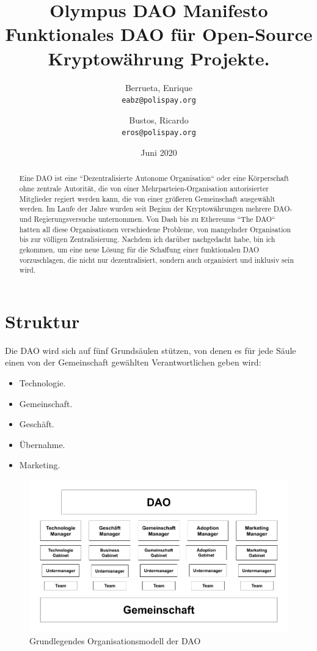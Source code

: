 \documentclass{article}
\title{%
  Olympus DAO Manifesto \\
  \large Funktionales DAO für Open-Source Kryptowährung Projekte.}
\author{
  Berrueta, Enrique\\
  \texttt{eabz@polispay.org}
  \and
  Bustos, Ricardo\\
  \texttt{eros@polispay.org}
}
\date{Juni 2020}
\begin{document}
\maketitle

	\begin{abstract}
    Eine DAO ist eine ``Dezentralisierte Autonome Organisation`` oder eine Körperschaft ohne zentrale Autorität, die von einer Mehrparteien-Organisation autorisierter Mitglieder regiert werden kann, die von einer größeren Gemeinschaft ausgewählt werden. Im Laufe der Jahre wurden seit Beginn der Kryptowährungen mehrere DAO- und Regierungsversuche unternommen. Von Dash bis zu Ethereums ``The DAO`` hatten all diese Organisationen verschiedene Probleme, von mangelnder Organisation bis zur völligen Zentralisierung. Nachdem ich darüber nachgedacht habe, bin ich gekommen, um eine neue Lösung für die Schaffung einer funktionalen DAO vorzuschlagen, die nicht nur dezentralisiert, sondern auch organisiert und inklusiv sein wird.
	\end{abstract}

\newpage

\tableofcontents


\newpage

\section{Struktur}

Die DAO wird sich auf fünf Grundsäulen stützen, von denen es für jede Säule einen von der Gemeinschaft gewählten Verantwortlichen geben wird:

\begin{itemize}
  \item Technologie.
  \item Gemeinschaft.
  \item Geschäft.
  \item Übernahme.
  \item Marketing.
\end{itemize}

\begin{figure}[h]
\includegraphics[scale=0.4]{img/dao_structure_de.png}
\centering
\caption{Grundlegendes Organisationsmodell der DAO}
\end{figure}
\end{document}
